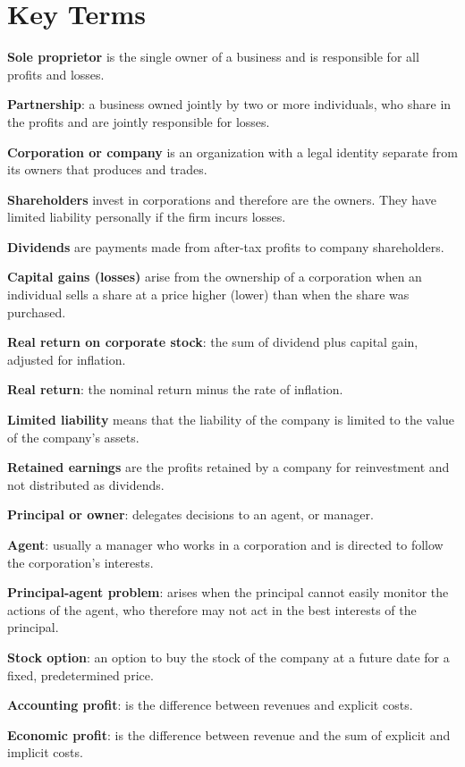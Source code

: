 \newpage
	\section*{Key Terms}
\begin{keyterms}
\textbf{Sole proprietor} is the single owner of a business and is responsible for all profits and losses.

\textbf{Partnership}: a business owned jointly by two or more individuals, who share in the profits and are jointly responsible for losses.

\textbf{Corporation or company} is an organization with a legal identity separate from its owners that produces and trades.

\textbf{Shareholders} invest in corporations and therefore are the owners. They have limited liability personally if the firm incurs losses.

\textbf{Dividends} are payments made from after-tax profits to company shareholders.

\textbf{Capital gains (losses)} arise from the ownership of a corporation when an individual sells a share at a price higher (lower) than when the share was purchased.

\textbf{Real return on corporate stock}: the sum of dividend plus capital gain, adjusted for inflation.

\textbf{Real return}: the nominal return minus the rate of inflation.

\textbf{Limited liability} means that the liability of the company is limited to the value of the company's assets.

\textbf{Retained earnings} are the profits retained by a company for reinvestment and not distributed as dividends.

\textbf{Principal or owner}: delegates decisions to an agent, or manager.

\textbf{Agent}: usually a manager who works in a corporation and is directed to follow the corporation's interests.

\textbf{Principal-agent problem}: arises when the principal cannot easily monitor the actions of the agent, who therefore may not act in the best interests of the principal.

\textbf{Stock option}: an option to buy the stock of the company at a future date for a fixed, predetermined price.

\textbf{Accounting profit}: is the difference between revenues and explicit costs. 

\textbf{Economic profit}: is the difference between revenue and the sum of explicit and implicit costs.


\end{keyterms}
